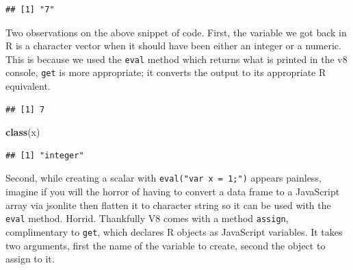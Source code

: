 \documentclass[
]{krantz}
\makeatletter
\newenvironment{Shaded}{\begin{snugshade}}{\end{snugshade}}
\newcommand{\CommentTok}[1]{\textcolor[rgb]{0.37,0.37,0.37}{\textit{#1}}}
\newcommand{\DecValTok}[1]{\textcolor[rgb]{0.06,0.06,0.06}{#1}}
\newcommand{\KeywordTok}[1]{\textcolor[rgb]{0.27,0.27,0.27}{\textbf{#1}}}
\newcommand{\NormalTok}[1]{#1}
\newcommand{\OperatorTok}[1]{\textcolor[rgb]{0.43,0.43,0.43}{\textbf{#1}}}
\newcommand{\StringTok}[1]{\textcolor[rgb]{0.5,0.5,0.5}{#1}}
\newenvironment{kframe}{%
\medskip{}
\setlength{\fboxsep}{.8em}
 \def\at@end@of@kframe{}%
 \ifinner\ifhmode%
  \def\at@end@of@kframe{\end{minipage}}%
  \begin{minipage}{\columnwidth}%
 \fi\fi%
 \def\FrameCommand##1{\hskip\@totalleftmargin \hskip-\fboxsep
 \colorbox{shadecolor}{##1}\hskip-\fboxsep
     \hskip-\linewidth \hskip-\@totalleftmargin \hskip\columnwidth}%
 \MakeFramed {\advance\hsize-\width
   \@totalleftmargin\z@ \linewidth\hsize
   \@setminipage}}%
 {\par\unskip\endMakeFramed%
 \at@end@of@kframe}
\renewenvironment{Shaded}{\begin{kframe}}{\end{kframe}}
\makeatother
\begin{document}
\begin{verbatim}
## [1] "7"
\end{verbatim}

Two observations on the above snippet of code. First, the variable we got back in R is a character vector when it should have been either an integer or a numeric. This is because we used the \texttt{eval} method which returns what is printed in the v8 console, \texttt{get} is more appropriate; it converts the output to its appropriate R equivalent.

\begin{Shaded}
\end{Shaded}

\begin{verbatim}
## [1] 7
\end{verbatim}

\begin{Shaded}
\begin{Highlighting}[]
\KeywordTok{class}\NormalTok{(x)}
\end{Highlighting}
\end{Shaded}

\begin{verbatim}
## [1] "integer"
\end{verbatim}

Second, while creating a scalar with \texttt{eval("var\ x\ =\ 1;")} appears painless, imagine if you will the horror of having to convert a data frame to a JavaScript array via jsonlite then flatten it to character string so it can be used with the \texttt{eval} method. Horrid. Thankfully V8 comes with a method \texttt{assign}, complimentary to \texttt{get}, which declares R objects as JavaScript variables. It takes two arguments, first the name of the variable to create, second the object to assign to it.

\begin{Shaded}
\end{Shaded}
\end{document}
